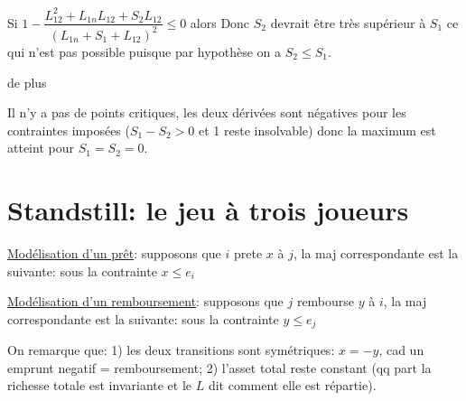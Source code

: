 \documentclass[11pt,oneside,twocolumn]{article}
\begin{document}
Si
$1 - \dfrac{L_{12}^2 + L_{1n}L_{12} + S_{2}L_{12}}{(L_{1n}+S_{1}+L_{12})^2} \leq 0$ alors
Donc $S_{2}$ devrait être très supérieur à $S_{1}$ ce qui n'est pas possible puisque par hypothèse on a $S_{2} \leq S_{1}$.

de plus


Il n'y a pas de points critiques, les deux dérivées sont négatives pour les contraintes imposées ($S_{1} - S_{2} > 0$ et 1 reste insolvable)  donc la maximum est atteint pour $S_{1}=S_{2}=0$.

\section{Standstill: le jeu à trois joueurs}\label{stand}
\underline{Modélisation d'un prêt}: supposons que $i$ prete $x$ à $j$,
la maj correspondante est la suivante:
sous la contrainte $x\leq e_i$

\underline{Modélisation d'un remboursement}: supposons que $j$ rembourse $y$ à $i$,
la maj correspondante est la suivante:
sous la contrainte $y\leq e_j$

On remarque que:
1) les deux transitions sont symétriques: $x=-y$,
cad un emprunt negatif = remboursement;
2) l'asset total reste constant (qq part la richesse totale est invariante
et le $L$ dit comment elle est répartie).
\end{document}
